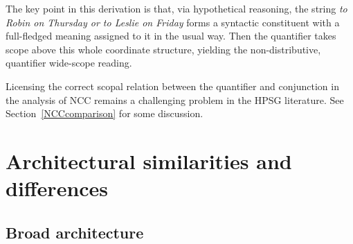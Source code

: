 \documentclass[output=paper,biblatex,babelshorthands,newtxmath,draftmode,colorlinks,citecolor=brown]{langscibook}
\begin{document}
The key point in this derivation is that, via hypothetical
reasoning, the string \textit{to Robin on Thursday or to Leslie on Friday}
forms a syntactic constituent with a full-fledged meaning assigned to
it in the usual way. Then the quantifier takes scope above this whole
coordinate structure, yielding the non-distributive, quantifier
wide-scope reading.

Licensing the correct scopal relation between the quantifier and
conjunction in the analysis of NCC remains a challenging problem in
the HPSG literature. See Section~\ref{NCCcomparison} for some
discussion.

\section{Architectural similarities and differences \label{architecture}}

\subsection{Broad architecture}
\end{document}
